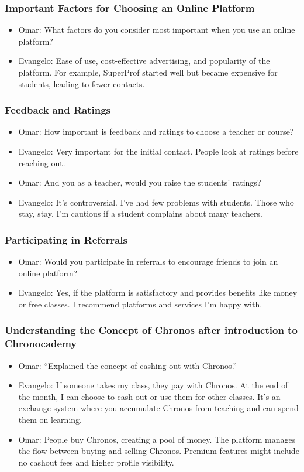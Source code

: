 \subsubsection*{Important Factors for Choosing an Online Platform}
\begin{itemize}
\item Omar: What factors do you consider most important when you use an online platform?
\item Evangelo: Ease of use, cost-effective advertising, and popularity of the platform. For example, SuperProf started well but became expensive for students, leading to fewer contacts.
\end{itemize}

\subsubsection*{Feedback and Ratings}
\begin{itemize}
\item Omar: How important is feedback and ratings to choose a teacher or course?
\item Evangelo: Very important for the initial contact. People look at ratings before reaching out.
\item Omar: And you as a teacher, would you raise the students' ratings?
\item Evangelo: It’s controversial. I’ve had few problems with students. Those who stay, stay. I’m cautious if a student complains about many teachers.
\end{itemize}

\subsubsection*{Participating in Referrals}
\begin{itemize}
\item Omar: Would you participate in referrals to encourage friends to join an online platform?
\item Evangelo: Yes, if the platform is satisfactory and provides benefits like money or free classes. I recommend platforms and services I’m happy with.
\end{itemize}

\subsubsection*{Understanding the Concept of Chronos after introduction to Chronocademy }
\begin{itemize}
\item Omar: “Explained the concept of cashing out with Chronos.”
\item Evangelo: If someone takes my class, they pay with Chronos. At the end of the month, I can choose to cash out or use them for other classes. It’s an exchange system where you accumulate Chronos from teaching and can spend them on learning.
\item Omar: People buy Chronos, creating a pool of money. The platform manages the flow between buying and selling Chronos. Premium features might include no cashout fees and higher profile visibility.
\end{itemize}

